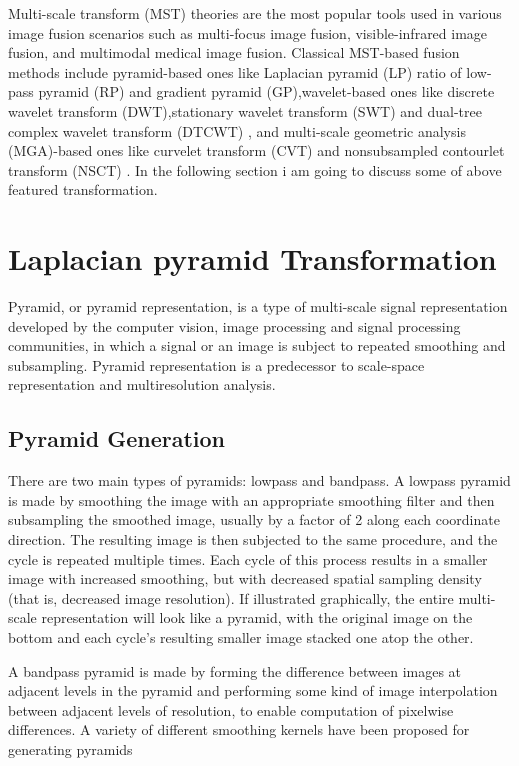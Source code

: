 Multi-scale transform (MST) theories are the most popular tools
used in various image fusion scenarios such as multi-focus image fusion, visible-infrared image fusion, and multimodal medical image fusion. Classical MST-based fusion methods include pyramid-based ones like Laplacian pyramid (LP)\cite{2} 
 ratio of low-pass pyramid (RP)\cite{3} and gradient pyramid (GP)\cite{4},wavelet-based ones like discrete wavelet transform (DWT)\cite{5},stationary wavelet transform (SWT) \cite{6} and dual-tree complex wavelet transform (DTCWT) \cite{7}, and multi-scale geometric analysis (MGA)-based ones like curvelet transform (CVT)\cite{8} and nonsubsampled contourlet transform (NSCT) \cite{9}. 
\hfill \break 
In the following section i am going to discuss some of above featured transformation.

\section{Laplacian pyramid Transformation}

Pyramid, or pyramid representation, is a type of multi-scale signal representation developed by the computer vision, image processing and signal processing communities, in which a signal or an image is subject to repeated smoothing and subsampling. Pyramid representation is a predecessor to scale-space representation and multiresolution analysis.

\subsection{Pyramid Generation}
There are two main types of pyramids: lowpass and bandpass.
\hfill \break
A lowpass pyramid is made by smoothing the image with an appropriate smoothing filter and then subsampling the smoothed image, usually by a factor of 2 along each coordinate direction. The resulting image is then subjected to the same procedure, and the cycle is repeated multiple times. Each cycle of this process results in a smaller image with increased smoothing, but with decreased spatial sampling density (that is, decreased image resolution). If illustrated graphically, the entire multi-scale representation will look like a pyramid, with the original image on the bottom and each cycle's resulting smaller image stacked one atop the other. \hfill \break

A bandpass pyramid is made by forming the difference between images at adjacent levels in the pyramid and performing some kind of image interpolation between adjacent levels of resolution, to enable computation of pixelwise differences.
\hfill \break
A variety of different smoothing kernels have been proposed for generating pyramids


